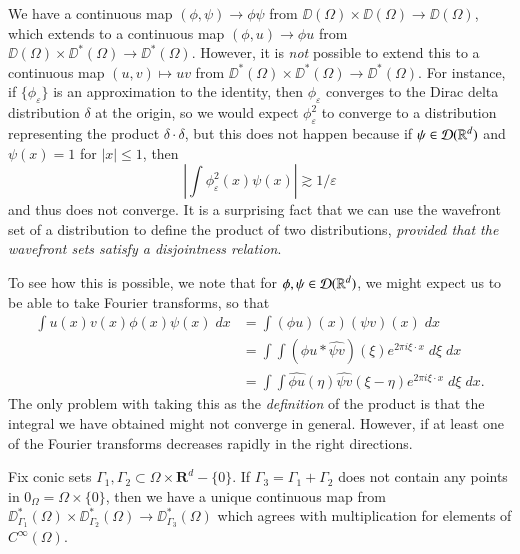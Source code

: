We have a continuous map $(\phi,\psi) \to \phi \psi$ from $\DD(\Omega) \times \DD(\Omega) \to \DD(\Omega)$, which extends to a continuous map $(\phi,u) \to \phi u$ from $\DD(\Omega) \times \DD^*(\Omega) \to \DD^*(\Omega)$. However, it is \emph{not} possible to extend this to a continuous map $(u,v) \mapsto uv$ from $\DD^*(\Omega) \times \DD^*(\Omega) \to \DD^*(\Omega)$. For instance, if $\{ \phi_\varepsilon \}$ is an approximation to the identity, then $\phi_\varepsilon$ converges to the Dirac delta distribution $\delta$ at the origin, so we would expect $\phi_\varepsilon^2$ to converge to a distribution representing the product $\delta \cdot \delta$, but this does not happen because if $\psi \in \operatorname{\mathcal{D}}(\operatorname{\mathbb{R}}^d)$ and $\psi(x) = 1$ for $|x| \leq 1$, then
%
\[ \left| \int \phi_\varepsilon^2(x) \psi(x) \right| \gtrsim 1/\varepsilon \]
%
and thus does not converge. It is a surprising fact that we can use the wavefront set of a distribution to define the product of two distributions, \emph{provided that the wavefront sets satisfy a disjointness relation}.

To see how this is possible, we note that for $\phi,\psi \in \operatorname{\mathcal{D}}(\operatorname{\mathbb{R}}^d)$, we might expect us to be able to take Fourier transforms, so that
%
\begin{align*}
    \int u(x) v(x) \phi(x) \psi(x)\; dx &= \int (\phi u)(x) (\psi v)(x)\; dx\\
    &= \int \int (\widehat{\phi u} * \widehat{\psi v})(\xi) e^{2 \pi i \xi \cdot x}\; d\xi\; dx\\
    &= \int \int \widehat{\phi u}(\eta) \widehat{\psi v}(\xi - \eta) e^{2 \pi i \xi \cdot x}\; d\xi\; dx.
\end{align*}
%
The only problem with taking this as the \emph{definition} of the product is that the integral we have obtained might not converge in general. However, if at least one of the Fourier transforms decreases rapidly in the right directions.

\begin{theorem}
    Fix conic sets $\Gamma_1,\Gamma_2 \subset \Omega \times \mathbf{R}^d - \{ 0 \}$. If $\Gamma_3 = \Gamma_1 + \Gamma_2$ does not contain any points in $0_\Omega = \Omega \times \{ 0 \}$, then we have a unique continuous map from $\DD^*_{\Gamma_1}(\Omega) \times \DD^*_{\Gamma_2}(\Omega) \to \DD^*_{\Gamma_3}(\Omega)$ which agrees with multiplication for elements of $C^\infty(\Omega)$.
\end{theorem}

